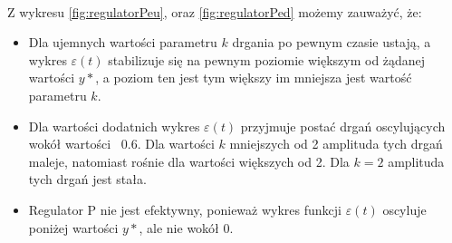 \documentclass[a4paper,10pt]{article}
\begin{document}
\\ Z wykresu \ref{fig:regulatorPeu}, oraz \ref{fig:regulatorPed} możemy zauważyć, że:
\begin{itemize}
	\item Dla ujemnych wartości parametru $k$ drgania po pewnym czasie ustają, a wykres $\varepsilon(t)$ stabilizuje się na pewnym poziomie większym od żądanej wartości $y*$, a poziom ten jest tym większy im mniejsza jest wartość parametru $k$.
	\item Dla wartości dodatnich wykres $\varepsilon(t)$ przyjmuje postać drgań oscylujących wokół wartości ~0.6. Dla wartości $k$ mniejszych od 2 amplituda tych drgań maleje, natomiast rośnie dla wartości większych od 2. Dla $k=2$ amplituda tych drgań jest stała.
	\item Regulator P nie jest efektywny, ponieważ wykres funkcji $\varepsilon(t)$ oscyluje poniżej wartości $y*$, ale nie wokół 0.
\end{itemize}
\end{document}
